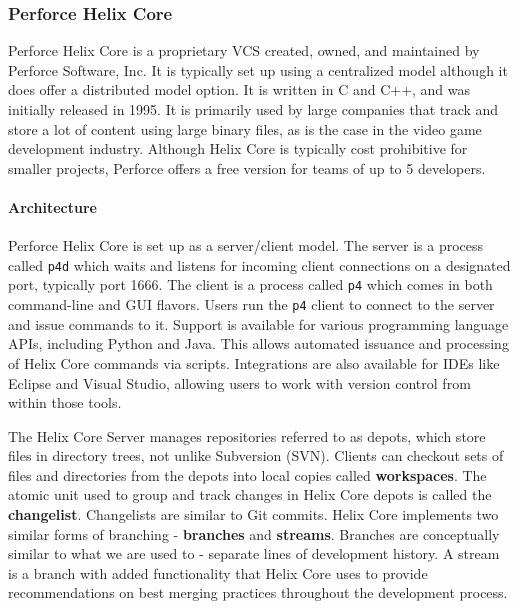 \subsubsection{Perforce Helix Core}
Perforce Helix Core is a proprietary VCS created, owned, and maintained by Perforce Software, Inc. It is typically set up using a centralized model although it does offer a distributed model option. It is written in C and C++, and was initially released in 1995. It is primarily used by large companies that track and store a lot of content using large binary files, as is the case in the video game development industry. Although Helix Core is typically cost prohibitive for smaller projects, Perforce offers a free version for teams of up to 5 developers.
\paragraph{Architecture}
Perforce Helix Core is set up as a server/client model. The server is a process called \lstinline{p4d} which waits and listens for incoming client connections on a designated port, typically port 1666. The client is a process called \lstinline{p4} which comes in both command-line and GUI flavors. Users run the \lstinline{p4} client to connect to the server and issue commands to it. Support is available for various programming language APIs, including Python and Java. This allows automated issuance and processing of Helix Core commands via scripts. Integrations are also available for IDEs like Eclipse and Visual Studio, allowing users to work with version control from within those tools.

The Helix Core Server manages repositories referred to as depots, which store files in directory trees, not unlike Subversion (SVN). Clients can checkout sets of files and directories from the depots into local copies called \textbf{workspaces}. The atomic unit used to group and track changes in Helix Core depots is called the \textbf{changelist}. Changelists are similar to Git commits. Helix Core implements two similar forms of branching - \textbf{branches} and \textbf{streams}. Branches are conceptually similar to what we are used to - separate lines of development history. A stream is a branch with added functionality that Helix Core uses to provide recommendations on best merging practices throughout the development process.

